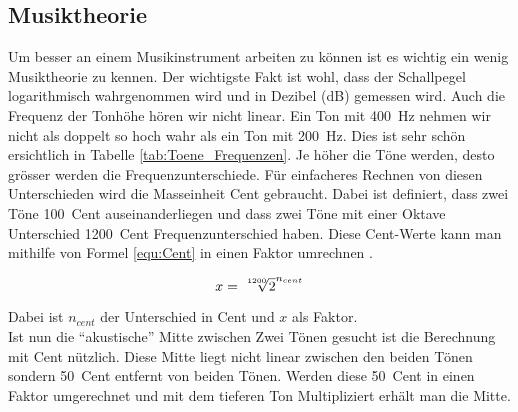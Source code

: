 \subsection{Musiktheorie}\label{subsec:Musiktheorie}

Um besser an einem Musikinstrument arbeiten zu können ist es wichtig ein wenig Musiktheorie zu kennen. Der wichtigste Fakt ist wohl, dass der Schallpegel logarithmisch wahrgenommen wird und in Dezibel (dB) gemessen wird. Auch die Frequenz der Tonhöhe hören wir nicht linear. Ein Ton mit \SI{400}{Hz} nehmen wir nicht als doppelt so hoch wahr als ein Ton mit \SI{200}{Hz}. Dies ist sehr schön ersichtlich in Tabelle \ref{tab:Toene_Frequenzen}. Je höher die Töne werden, desto grösser werden die Frequenzunterschiede. Für einfacheres Rechnen von diesen Unterschieden wird die Masseinheit Cent gebraucht. Dabei ist definiert, dass zwei Töne \SI{100}{Cent} auseinanderliegen und dass zwei Töne mit einer Oktave Unterschied \SI{1200}{Cent} Frequenzunterschied haben. Diese Cent-Werte kann man mithilfe von Formel \ref{equ:Cent} in einen Faktor umrechnen \cite{Cent}.

\begin{equation}
x = \sqrt[\leftroot{-2}\uproot{1}1200]{2}^{n_{cent}}
\label{equ:Cent}
\end{equation} 

Dabei ist \(n_{cent}\) der Unterschied in Cent und \(x\) als Faktor.\\ Ist nun die ``akustische'' Mitte zwischen Zwei Tönen gesucht ist die Berechnung mit Cent nützlich. Diese Mitte liegt nicht linear zwischen den beiden Tönen sondern \SI{50}{Cent} entfernt von beiden Tönen. Werden diese \SI{50}{Cent} in einen Faktor umgerechnet und mit dem tieferen Ton Multipliziert erhält man die Mitte.



